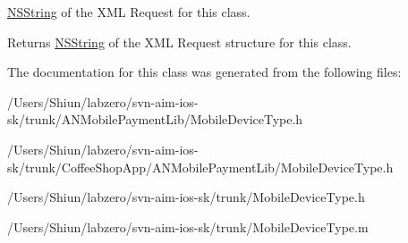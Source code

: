 \hyperlink{class_n_s_string}{NSString} of the XML Request for this class. 

\begin{DoxyReturn}{Returns}
\hyperlink{class_n_s_string}{NSString} of the XML Request structure for this class. 
\end{DoxyReturn}


The documentation for this class was generated from the following files:\begin{DoxyCompactItemize}
\item 
/Users/Shiun/labzero/svn-\/aim-\/ios-\/sk/trunk/ANMobilePaymentLib/MobileDeviceType.h\item 
/Users/Shiun/labzero/svn-\/aim-\/ios-\/sk/trunk/CoffeeShopApp/ANMobilePaymentLib/MobileDeviceType.h\item 
/Users/Shiun/labzero/svn-\/aim-\/ios-\/sk/trunk/MobileDeviceType.h\item 
/Users/Shiun/labzero/svn-\/aim-\/ios-\/sk/trunk/MobileDeviceType.m\end{DoxyCompactItemize}
